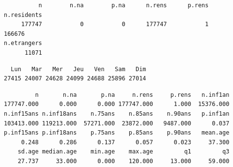 \documentclass[]{article}
\newenvironment{Shaded}{\begin{snugshade}}{\end{snugshade}}
\newcommand{\KeywordTok}[1]{\textcolor[rgb]{0.13,0.29,0.53}{\textbf{{#1}}}}
\newcommand{\StringTok}[1]{\textcolor[rgb]{0.31,0.60,0.02}{{#1}}}
\newcommand{\CommentTok}[1]{\textcolor[rgb]{0.56,0.35,0.01}{\textit{{#1}}}}
\newcommand{\NormalTok}[1]{{#1}}
\begin{document}
\begin{Shaded}
\end{Shaded}

\begin{verbatim}
          n        n.na        p.na      n.rens      p.rens n.residents 
     177747           0           0      177747           1      166676 
n.etrangers 
      11071 
\end{verbatim}

\begin{Shaded}
\end{Shaded}

\begin{verbatim}
  Lun   Mar   Mer   Jeu   Ven   Sam   Dim 
27415 24007 24628 24099 24688 25896 27014 
\end{verbatim}

\begin{Shaded}
\end{Shaded}

\begin{verbatim}
         n       n.na       p.na     n.rens     p.rens   n.inf1an 
177747.000      0.000      0.000 177747.000      1.000  15376.000 
n.inf15ans n.inf18ans    n.75ans    n.85ans    n.90ans   p.inf1an 
103413.000 119213.000  57271.000  23872.000   9487.000      0.037 
p.inf15ans p.inf18ans    p.75ans    p.85ans    p.90ans   mean.age 
     0.248      0.286      0.137      0.057      0.023     37.300 
    sd.age median.age    min.age    max.age         q1         q3 
    27.737     33.000      0.000    120.000     13.000     59.000 
\end{verbatim}

\begin{Shaded}
\end{Shaded}
\end{document}
